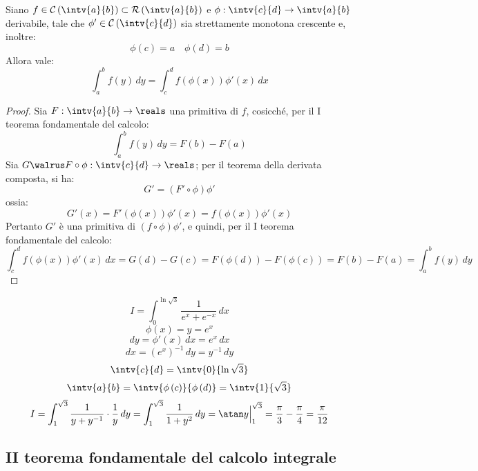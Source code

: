 \begin{theorem}
  Siano $f\in\mathcal{C}\left( \intv{a}{b} \right)\subset\mathcal{R}\left( \intv{a}{b} \right)$ e $\phi:\intv{c}{d}\to\intv{a}{b}$ derivabile, tale che $\phi'\in\mathcal{C}\left( \intv{c}{d} \right)$ sia strettamente monotona crescente e, inoltre:
  $$\phi\left( c \right)=a\quad\phi\left( d \right)=b$$
  Allora vale:
  $$\int_a^bf\left( y \right)\,dy=\int_c^df\left( \phi\left( x \right) \right)\phi'\left( x \right)\,dx$$
\end{theorem}
\begin{proof}
  Sia $F:\intv{a}{b}\to\reals$ una primitiva di $f$, cosicché, per il I teorema fondamentale del calcolo:
  $$\int_a^bf\left( y \right)\,dy=F\left( b \right)-F\left( a \right)$$
  Sia $G\walrus F\circ \phi:\intv{c}{d}\to\reals$; per il teorema della derivata composta, si ha:
  $$G'=\left( F'\circ \phi \right)\phi'$$
  ossia:
  $$G'\left( x \right)=F'\left( \phi\left( x \right) \right)\phi'\left( x \right)=f\left( \phi\left( x \right) \right)\phi'\left( x \right)$$
  Pertanto $G'$ è una primitiva di $\left( f\circ \phi \right)\phi'$, e quindi, per il I teorema fondamentale del calcolo:
  $$\int_c^df\left( \phi\left( x \right) \right)\phi'\left( x \right)\,dx=G\left( d \right)-G\left( c \right)=F\left( \phi\left( d \right) \right)-F\left( \phi\left( c \right) \right)=F\left( b \right)-F\left( a \right)=\int_a^bf\left( y \right)\,dy$$
\end{proof}

\begin{example}
  $$I=\int_0^{\ln\sqrt{3}}\frac{1}{e^x+e^{-x}}\,dx$$
  $$\phi\left( x \right)=y=e^x$$
  $$dy=\phi'\left( x \right)\,dx=e^x\,dx$$
  $$dx=\left( e^x \right)^{-1}\,dy=y^{-1}\,dy$$
  $$\intv{c}{d}=\intv{0}{\ln\sqrt{3}}$$
  $$\intv{a}{b}=\intv{\phi\left( c \right)}{\phi\left( d \right)}=\intv{1}{\sqrt{3}}$$
  $$I=\int_1^{\sqrt{3}}\frac{1}{y+y^{-1}}\cdot\frac{1}{y}\,dy=\int_1^{\sqrt{3}}\frac{1}{1+y^2}\,dy=\atan y\Big|_1^{\sqrt{3}}=\frac{\pi}{3}-\frac{\pi}{4}=\frac{\pi}{12}$$
\end{example}

\subsection{II teorema fondamentale del calcolo integrale}

